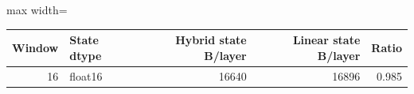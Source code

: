 \scriptsize
\setlength{\tabcolsep}{3.5pt}
\label{tab:t2bb3}
\begin{adjustbox}{max width=\linewidth}
\begin{tabular}{rlrrr}
\toprule
Window & State dtype & Hybrid state B/layer & Linear state B/layer & Ratio \\
\midrule
16 & float16 & 16640 & 16896 & 0.985 \\
\bottomrule
\end{tabular}
\end{adjustbox}
